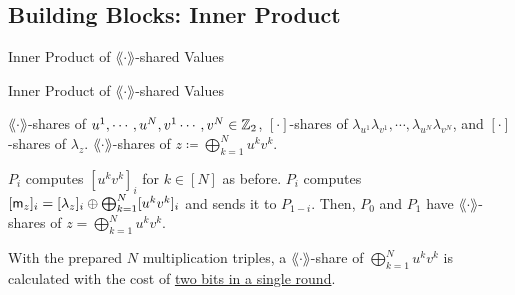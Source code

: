\documentclass[../240906_cryptlab_flute.tex]{subfiles}
\begin{document}
\subsection{Building Blocks: Inner Product}
\begin{frame}{Inner Product of \(\lang\cdot\rang\)-shared Values}
    \begin{block}{Inner Product of \(\lang\cdot\rang\)-shared Values}
        \begin{description}[Output]
            \ii[Input]
            \(\lang\cdot\rang\)-shares of \(u^1, \cdots, u^N, v^1 \cdots, v^N \in \mathbb{Z}_2\),
            \([\cdot]\)-shares of \(\lambda_{u^1} \lambda_{v^1},
            \cdots, \lambda_{u^N} \lambda_{v^N}\),
            and \([\cdot]\)-shares of \(\lambda_z\).
            \ii[Output]
            \(\lang\cdot\rang\)-shares of \(z \coloneqq \bigoplus_{k=1}^N u^k v^k\).
        \end{description}
        \pause
        \begin{enumerate}
            \ii \(P_i\) computes \([u^k v^k]_i\) for \(k \in [N]\) as before.
            \pause
            \ii \(P_i\) computes
            \([\mathsf{m}_z]_i = [\lambda_z]_i \oplus \bigoplus_{k=1}^N [u^k v^k]_i\)
            and sends it to \(P_{1-i}\).
            \ii
            Then, \(P_0\) and \(P_1\) have \(\lang\cdot\rang\)-shares of \(z = \bigoplus_{k=1}^N u^k v^k\).
        \end{enumerate}
        \pause
        With the prepared \(N\) multiplication triples,
        a \(\lang\cdot\rang\)-share of \(\bigoplus_{k=1}^N u^k v^k\)
        is calculated with the cost of \ul{two bits in a single round}.
    \end{block}
\end{frame}
\end{document}
